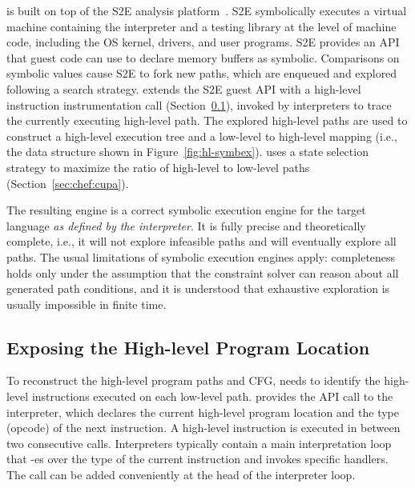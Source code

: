 \chef is built on top of the S2E analysis platform~\cite{s2eSystem}. S2E symbolically executes a virtual machine containing the interpreter and a testing library at the level of machine code,  including the OS kernel, drivers, and user programs.  S2E provides an API that guest code can use to declare memory buffers as symbolic. Comparisons on symbolic values cause S2E to fork new paths, which are enqueued and explored following a search strategy.
%
\chef extends the S2E guest API with a high-level instruction instrumentation call (Section~\ref{sec:chef:exposehlpc}), invoked by interpreters to trace the currently executing high-level path.  The explored high-level paths are used to construct a high-level execution tree and a low-level to high-level mapping (i.e., the data structure shown in Figure~\ref{fig:hl-symbex}).  \chef uses a state selection strategy to maximize the ratio of high-level to low-level paths (Section~\ref{sec:chef:cupa}).

The resulting engine is a correct symbolic execution engine for the target language \textit{as defined by the interpreter}. It is fully precise and theoretically complete, i.e., it will not explore infeasible paths and will eventually explore all paths. The usual limitations of symbolic execution engines apply: completeness holds only under the assumption that the constraint solver can reason about all generated path conditions, and it is understood that exhaustive exploration is usually impossible in finite time.


\subsection{Exposing the High-level Program Location}
\label{sec:chef:exposehlpc}

To reconstruct the high-level program paths and CFG, \chef needs to identify the high-level instructions executed on each low-level path.  \chef provides the  API call to the interpreter, which declares the current high-level program location and the type (opcode) of the next instruction.  A high-level instruction is executed in between two consecutive  calls.
%
Interpreters typically contain a main interpretation loop that -es over the type of the current instruction and invokes specific handlers.  The  call can be added conveniently at the head of the interpreter loop.


